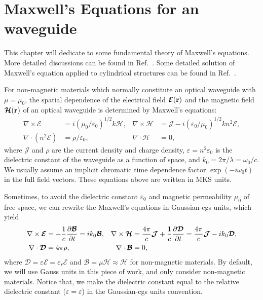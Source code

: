 \chapter{Maxwell's Equations for an waveguide}
This chapter will dedicate to some fundamental theory of Maxwell's equations. More detailed 
discussions can be found in Ref.~\cite{Snyder1983Optical}. Some detailed solution of Maxwell's equation 
applied to cylindrical structures can be found in Ref.~\cite{Wait1959}. 

For non-magnetic materials which normally constitute an optical waveguide with $ \mu=\mu_0 $, the 
spatial dependence of the electrical field $ \boldsymbol{\mathcal{E}}(\mathbf{r}) $ and the magnetic field $ 
\boldsymbol{\mathcal{H}}(\mathbf{r}) $ of an optical waveguide is determined by Maxwell's equations:
\begin{align}
\nabla\times \boldsymbol{\mathcal{E}} &= i(\mu_0/\varepsilon_0)^{1/2} k \boldsymbol{\mathcal{H}}, & 
\nabla\times \boldsymbol{\mathcal{H}} &= \boldsymbol{\mathcal{J}}-i(\varepsilon_0/\mu_0)^{1/2}kn^2 
\boldsymbol{\mathcal{E}}, \label{EHtimesMKS}\\
\nabla\cdot (n^2 \boldsymbol{\mathcal{E}}) &= \rho/\varepsilon_0, & \nabla\cdot 
\boldsymbol{\mathcal{H}} &=0, \label{EHdotsMKS}
\end{align}
where $ \boldsymbol{\mathcal{J}} $ and $ \rho $ are the current density and charge density, $ 
\varepsilon=n^2 \varepsilon_0 $ is the dielectric constant of the waveguide as a function of space, and $ 
k_0=2\pi/\lambda=\omega_0/c $.  We usually assume an implicit chromatic time dependence factor $ \exp(-i\omega_0 t) $ in the 
full field vectors. These equations above are written in MKS units. 

Sometimes, to avoid the dielectric constant $ \varepsilon_0 $ and magnetic permeability $ \mu_0 $ of 
free space, we can rewrite the Maxwell's equations in Gaussian-cgs units, which yield
\begin{align}
\nabla \times \boldsymbol{\mathcal{E}} &= -\frac{1}{c} \pt{\boldsymbol{\mathcal{B}}}=i 
k_0\boldsymbol{\mathcal{B}}, & \nabla \times 
\boldsymbol{\mathcal{H}} &= \frac{4\pi}{c} \boldsymbol{\mathcal{J}} + 
\frac{1}{c}\pt{\boldsymbol{\mathcal{D}}}= \frac{4\pi}{c}\boldsymbol{\mathcal{J}} 
-ik_0\boldsymbol{\mathcal{D}}, \label{eq:maxwelldiv}\\
\nabla \cdot \boldsymbol{\mathcal{D}} &= 4\pi \rho, & \nabla \cdot \boldsymbol{\mathcal{B}} &=0,\label{eq:maxwellgrad}
\end{align}
where $ \boldsymbol{\mathcal{D}} = \varepsilon \boldsymbol{\mathcal{E}}=\varepsilon_r \boldsymbol{\mathcal{E}} $ and $ 
\boldsymbol{\mathcal{B}}= \mu\boldsymbol{\mathcal{H}}\approx \boldsymbol{\mathcal{H}} $ for non-magnetic materials. By default, we will use Gauss units in this piece of work, and only consider non-magnetic materials. Notice that, we make the dielectric constant equal to the relative dielectric constant ($ \varepsilon=\varepsilon $) in the Gaussian-cgs units convention.  

